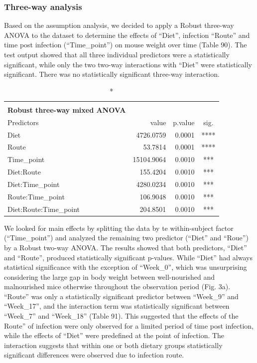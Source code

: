 \documentclass[
  12pt,
  letterpaper,
]{article}
\begin{document}
\subsubsection{Three-way analysis}\label{three-way-analysis-2}

Based on the assumption analysis, we decided to apply a Robust three-way ANOVA to the dataset to determine the effects of ``Diet'', infection ``Route'' and time post infection (``Time\_point'') on mouse weight over time (Table 90). The test output showed that all three individual predictors were a statistically significant, while only the two two-way interactions with ``Diet'' were statistically significant. There was no statistically significant three-way interaction.

\begin{longtable}{l|rrc}
\caption*{
{\large \textbf{Appendix Table 90}} \\ 
{\small \textbf{Robust three-way mixed ANOVA}}
} \\ 
\toprule
\multicolumn{1}{l}{Predictors} & value & p.value & sig. \\ 
\midrule\addlinespace[2.5pt]
Diet & 4726.0759 & 0.0001 & **** \\ 
Route & 53.7814 & 0.0001 & **** \\ 
Time\_point & 15104.9064 & 0.0010 & *** \\ 
Diet:Route & 155.4204 & 0.0010 & *** \\ 
Diet:Time\_point & 4280.0234 & 0.0010 & *** \\ 
Route:Time\_point & 106.9048 & 0.0010 & *** \\ 
Diet:Route:Time\_point & 204.8501 & 0.0010 & *** \\ 
\bottomrule
\end{longtable}

We looked for main effects by splitting the data by te within-subject factor (``Time\_point'') and analyzed the remaining two predictor (``Diet'' and ``Roue'') by a Robust two-way ANOVA. The results showed that both predictors, ``Diet'' and ``Route'', produced statistically significant p-values. While ``Diet'' had always statistical significance with the exception of ``Week\_0'', which was unsurprising considering the large gap in body weight between well-nourished and malnourished mice otherwise throughout the observation period (Fig. 3a). ``Route'' was only a statistically significant predictor between ``Week\_9'' and ``Week\_17'', and the interaction term was statistically significant between ``Week\_7'' and ``Week\_18'' (Table 91). This suggested that the effects of the Route'' of infection were only observed for a limited period of time post infection, while the effects of ``Diet'' were predefined at the point of infection. The interaction suggests that within one or both dietary groups statistically significant differences were observed due to infection route.
\end{document}
